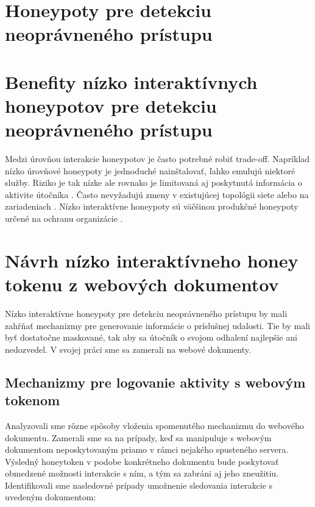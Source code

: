 \documentclass[conference, 11pt,slovak,a4paper,twoside]{IEEEtran}
\begin{document}
\section{Honeypoty pre detekciu neoprávneného prístupu}

\section{Benefity nízko interaktívnych honeypotov pre detekciu neoprávneného prístupu}

Medzi úrovňou interakcie honeypotov je často potrebné robiť trade-off. Napríklad nízko úrovňové honeypoty je jednoduché nainštalovať, ľahko emulujú niektoré služby. Riziko je tak nízke ale rovnako je limitovaná aj poskytnutá informácia o aktivite útočníka \cite{spitzner_honeypots_2002}. Často nevyžadujú zmeny v existujúcej topológii siete alebo na zariadeniach \cite{scada_2014}. Nízko interaktívne honeypoty sú väčšinou produkčné honeypoty určené na ochranu organizácie \cite{spitzner_honeypots_2002}.


\section{Návrh nízko interaktívneho honey tokenu z webových dokumentov}

Nízko interaktívne honeypoty pre detekciu neoprávneného prístupu by mali zahŕňať mechanizmy pre generovanie informácie o príslušnej udalosti. Tie by mali byť dostatočne maskované, tak aby sa útočník o svojom odhalení najlepšie ani nedozvedel. V svojej práci sme sa zamerali na webové dokumenty. 


\subsection{Mechanizmy pre logovanie aktivity s webovým tokenom}

Analyzovali sme rôzne spôsoby vloženia spomenutého mechanizmu do webového dokumentu. Zamerali sme sa na prípady, keď sa manipuluje s webovým dokumentom neposkytovaným priamo v rámci nejakého spusteného servera. Výsledný honeytoken v podobe konkrétneho dokumentu bude poskytovať obmedzené možnosti interakcie s ním, a tým sa zabráni aj jeho zneužitiu. Identifikovali sme nasledovné prípady umožnenie sledovania interakcie s uvedeným dokumentom:
\end{document}
